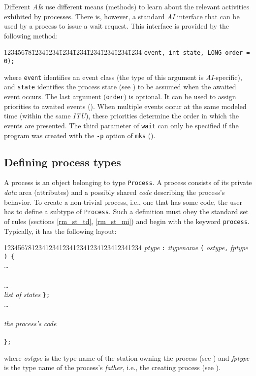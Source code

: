 Different {\em AI\/}s use different means (methods) to learn about the relevant
activities exhibited by processes.
There is, however, a standard {\em AI\/} interface that can be
used by a process to issue a wait request.
This interface is provided by the following method:
{\tt\begin{tabbing}
12345678\=1234\=1234\=1234\=1234\=1234\=1234\=1234\=1234\kill
{} {\tt event, int state, LONG order = 0);}
\end{tabbing}}
\noindent
where {\tt event} identifies an event class (the type of this argument is
{\em AI\/}-specific), and {\tt state} identifies the process state
(see ) to be assumed when the awaited event occurs.
The last argument ({\tt order}) is optional.
It can be used to assign priorities to awaited events ().
When multiple events occur at the same modeled time (within the same
{\em ITU\/}), these priorities determine the order in which the events
are presented.
The third parameter of {\tt wait} can only be specified if the
program was created with the {\tt -p} option of {\tt mks} ().

\subsection{Defining process types}
\label{rm_pr_dp}

A process is an object belonging to type {\tt Process}.
A process consists of its private {\em data\/} area (attributes)
and a possibly shared
{\em code\/} describing the process's behavior.
To create a non-trivial process, i.e., one that has some code, the user
has to define a subtype of {\tt Process}.
Such a definition must obey the standard set of rules (sections
\ref{rm_st_td}, \ref{rm_st_mi}) and begin with the keyword
{\tt process}.
Typically, it has the following layout:
{\tt\begin{tabbing}
12345678\=1234\=1234\=1234\=1234\=1234\=1234\=1234\=1234\kill
{} {\em ptype\/} {\tt :} {\em itypename\/} {\tt (} {\em ostype}{\tt ,} {\em fptype\/} {\tt ) \{} \\
\> \>\ldots \\
\>  \\
\> \>\ldots \\
\>  {\em list of states\/} {\tt \};} \\
\> \>\ldots \\
\>  \\
\> \> \> {\em the process's code} \\
\> \>{\tt \};} \\
\> {\tt \};}
\end{tabbing}}
\noindent
where {\em ostype\/}
is the type name of the station owning the process (see )
and {\em fptype\/}
is the type name of the process's {\em father}, i.e., the creating process
(see ).


